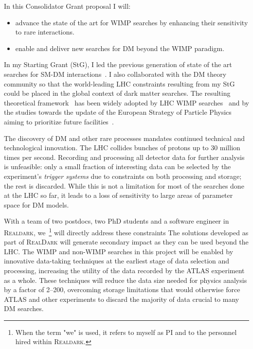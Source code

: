 \documentclass[11pt,a4paper]{article}
\begin{document}
In this Consolidator Grant proposal I will:
\begin{itemize}
    \item advance the state of the art for WIMP searches by enhancing their sensitivity to rare interactions.
    \item enable and deliver new searches for DM beyond the WIMP paradigm. 
\end{itemize}

In my Starting Grant (StG), I led the previous generation of state of the art searches for SM-DM interactions~\cite{Aaboud:2018fzt,Aaboud:2019zxd}. 
I also collaborated with the DM theory community so that the world-leading LHC constraints resulting from my StG could be placed in the global context of dark matter searches. 
The resulting theoretical framework~\cite{Abercrombie:2015wmb} has been widely adopted by LHC WIMP searches~\cite{Aaboud:2019yqu} and by the studies towards the update of the European Strategy of Particle Physics aiming to prioritize future facilities~\cite{Strategy:2019vxc}.  

The discovery of DM and other rare processes mandates continued technical and technological innovation. 
The LHC collides bunches of protons up to 30 million times per second. 
Recording and processing all detector data for further analysis is unfeasible: only a small fraction of interesting data can be selected by the experiment’s \textit{trigger systems} due to constraints on both processing and storage; the rest is discarded.
While this is not a limitation for most of the searches done at the LHC so far,
it leads to a loss of sensitivity to large areas of parameter space for DM models. 

With a team of two postdocs, two PhD students and a software engineer in \textsc{Realdark}, we~\footnote{When the term "we" is used, it refers to myself as PI and to the personnel hired within \textsc{Realdark}.} will directly address these constraints
The solutions developed as part of \textsc{RealDark} will generate secondary impact as they can be used beyond the LHC. %
The WIMP and non-WIMP searches in this project will be enabled by innovative data-taking techniques at the earliest stage of data selection and processing, increasing the utility of the data recorded by the ATLAS experiment as a whole. 
These techniques will reduce the data size needed for physics analysis by a factor of 2--200, %
overcoming storage limitations that would otherwise force ATLAS and other experiments to discard the majority of data crucial to many DM searches.
\end{document}

